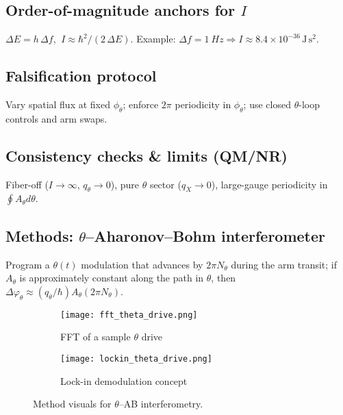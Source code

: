 
\subsection{Order-of-magnitude anchors for \texorpdfstring{$I$}{I}}\label{sec:iom}
$\Delta E=h\,\Delta f$, $\ I\approx \hbar^2/(2\,\Delta E)$. Example: $\Delta f=\SI{1}{Hz}\Rightarrow I\approx 8.4\times 10^{-36}\,\mathrm{J\,s^2}$.

\subsection{Falsification protocol}\label{sec:falsification}
Vary spatial flux at fixed $\phi_\theta$; enforce $2\pi$ periodicity in $\phi_\theta$; use closed $\theta$-loop controls and arm swaps.

\subsection{Consistency checks \& limits (QM/NR)}\label{sec:lab-consistency}
Fiber-off ($I\to\infty$, $q_\theta\to 0$), pure $\theta$ sector ($q_X\to 0$), large-gauge periodicity in $\oint A_\theta d\theta$.

\subsection{Methods: \texorpdfstring{$\theta$}{theta}--Aharonov--Bohm interferometer}\label{sec:methods-theta-ab}
Program a $\theta(t)$ modulation that advances by $2\pi N_\theta$ during the arm transit; if $A_\theta$ is approximately constant along the path in $\theta$, then $\Delta\varphi_\theta \approx (q_\theta/\hbar) A_\theta (2\pi N_\theta)$.

\begin{figure}[h]
  \centering
  \begin{subfigure}[b]{0.48\linewidth}
    \centering
  \texttt{[image: fft\_theta\_drive.png]}
    \caption{FFT of a sample $\theta$ drive}
    \label{fig:fft-theta}
  \end{subfigure}\hfill
  \begin{subfigure}[b]{0.48\linewidth}
    \centering
  \texttt{[image: lockin\_theta\_drive.png]}
    \caption{Lock-in demodulation concept}
    \label{fig:lockin-theta}
  \end{subfigure}
  \caption{Method visuals for $\theta$--AB interferometry.}
  \label{fig:methods}
\end{figure}

